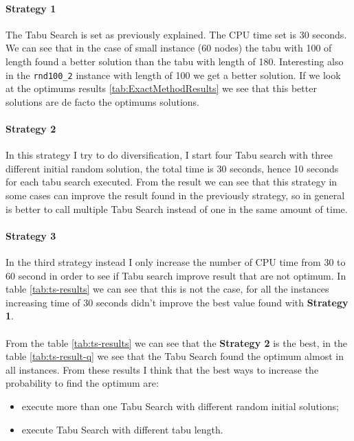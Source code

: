 		\paragraph{Strategy 1} The Tabu Search is set as previously explained. The CPU time set is 30 seconds. We can see that in the case of small instance (60 nodes) the tabu with 100 of length found a better solution than the tabu with length of 180. Interesting also in the \verb|rnd100_2| instance with length of 100 we get a better solution. If we look at the optimums results \ref{tab:ExactMethodResults} we see that this better solutions are de facto the optimums solutions.
		
		\paragraph{Strategy 2} In this strategy I try to do diversification, I start four Tabu search with three different initial random solution, the total time is 30 seconds, hence 10 seconds for each tabu search executed. From the result we can see that this strategy in some cases can improve the result found in the previously strategy, so in general is better to call multiple Tabu Search instead of one in the same amount of time.
		
		\paragraph{Strategy 3} In the third strategy instead I only increase the number of CPU time from 30 to 60 second in order to see if Tabu search improve result that are not optimum. In table \ref{tab:ts-results} we can see that this is not the case, for all the instances increasing  time of 30 seconds didn't improve the best value found with \textbf{Strategy 1}.
		
		\paragraph*{} From the table \ref{tab:ts-results} we can see that the \textbf{Strategy 2} is the best, in the table \ref{tab:ts-result-q} we see that the Tabu Search found the optimum almost in all instances. From these results I think that the best ways to increase the probability to find the optimum are:
		\begin{itemize}
			\item execute more than one Tabu Search with different random initial solutions;
			\item execute Tabu Search with different tabu length.
		\end{itemize}
		
